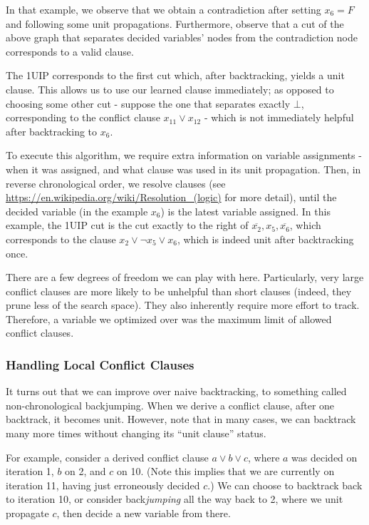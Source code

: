 \documentclass{article}
\begin{document}
In that example, we observe that we obtain a contradiction after setting $x_6 = F$ and following some unit propagations.
Furthermore, observe that a cut of the above graph that separates decided variables' nodes from the contradiction node corresponds to a valid clause.

The 1UIP corresponds to the first cut which, after backtracking, yields a unit clause.
This allows us to use our learned clause immediately;
as opposed to choosing some other cut - suppose the one that separates exactly $\bot$, corresponding to the conflict clause $x_{11} \lor x_{12}$ - which is not immediately helpful after backtracking to $x_6$.

To execute this algorithm, we require extra information on variable assignments - when it was assigned, and what clause was used in its unit propagation.
Then, in reverse chronological order, we resolve clauses (see \url{https://en.wikipedia.org/wiki/Resolution_(logic)} for more detail), until the decided variable (in the example $x_6$) is the latest variable assigned.
In this example, the 1UIP cut is the cut exactly to the right of $\overline{x_2}, x_5, \overline{x_6}$, which corresponds to the clause $x_2 \lor \neg x_5 \lor x_6$, which is indeed unit after backtracking once.

There are a few degrees of freedom we can play with here.
Particularly, very large conflict clauses are more likely to be unhelpful than short clauses (indeed, they prune less of the search space).
They also inherently require more effort to track.
Therefore, a variable we optimized over was the maximum limit of allowed conflict clauses.

\subsubsection{Handling Local Conflict Clauses}
It turns out that we can improve over naive backtracking, to something called non-chronological backjumping.
When we derive a conflict clause, after one backtrack, it becomes unit.
However, note that in many cases, we can backtrack many more times without changing its ``unit clause'' status.

For example, consider a derived conflict clause $a \lor b \lor c$, where $a$ was decided on iteration 1, $b$ on 2, and $c$ on 10.
(Note this implies that we are currently on iteration 11, having just erroneously decided $c$.)
We can choose to backtrack back to iteration 10, or consider back\textit{jumping} all the way back to 2, where we unit propagate $c$, then decide a new variable from there.
\end{document}
